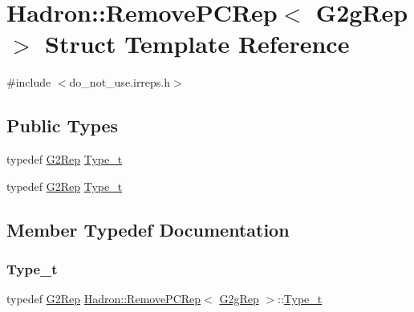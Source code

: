 \hypertarget{structHadron_1_1RemovePCRep_3_01G2gRep_01_4}{}\section{Hadron\+:\+:Remove\+P\+C\+Rep$<$ G2g\+Rep $>$ Struct Template Reference}
\label{structHadron_1_1RemovePCRep_3_01G2gRep_01_4}


{\ttfamily \#include $<$do\+\_\+not\+\_\+use.\+irreps.\+h$>$}

\subsection*{Public Types}
\begin{DoxyCompactItemize}
\item 
typedef \mbox{\hyperlink{structHadron_1_1G2Rep}{G2\+Rep}} \mbox{\hyperlink{structHadron_1_1RemovePCRep_3_01G2gRep_01_4_a941bc08fab6e6b89fb5316cdcc77cd49}{Type\+\_\+t}}
\item 
typedef \mbox{\hyperlink{structHadron_1_1G2Rep}{G2\+Rep}} \mbox{\hyperlink{structHadron_1_1RemovePCRep_3_01G2gRep_01_4_a941bc08fab6e6b89fb5316cdcc77cd49}{Type\+\_\+t}}
\end{DoxyCompactItemize}


\subsection{Member Typedef Documentation}
\mbox{\label{structHadron_1_1RemovePCRep_3_01G2gRep_01_4_a941bc08fab6e6b89fb5316cdcc77cd49}} 
\subsubsection{\texorpdfstring{Type\_t}{Type\_t}\hspace{0.1cm}{\footnotesize\ttfamily [1/2]}}
{\footnotesize\ttfamily typedef \mbox{\hyperlink{structHadron_1_1G2Rep}{G2\+Rep}} \mbox{\hyperlink{structHadron_1_1RemovePCRep}{Hadron\+::\+Remove\+P\+C\+Rep}}$<$ \mbox{\hyperlink{structHadron_1_1G2gRep}{G2g\+Rep}} $>$\+::\mbox{\hyperlink{structHadron_1_1RemovePCRep_3_01G2gRep_01_4_a941bc08fab6e6b89fb5316cdcc77cd49}{Type\+\_\+t}}}

